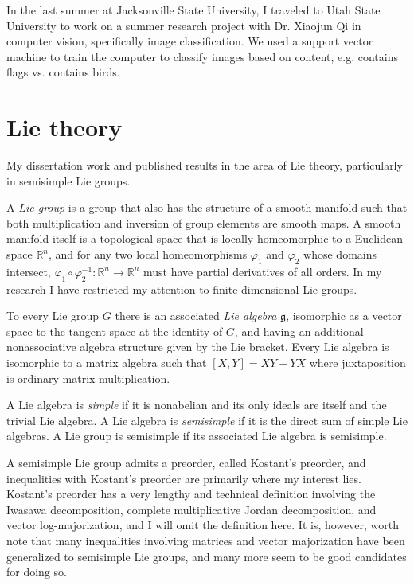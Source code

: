 \documentclass[11pt]{article}
\begin{document}
In the last summer at Jacksonville State University, I traveled to Utah State
University to work on a summer research project with Dr. Xiaojun Qi in computer
vision, specifically image classification. We used a support vector machine to
train the computer to classify images based on content, e.g. contains flags
vs. contains birds.

\section{Lie theory}

My dissertation work and published results in the area of
Lie theory, particularly in semisimple Lie groups.

A \emph{Lie group} is a group that also has the structure of a smooth manifold
such that both multiplication and inversion of group elements are smooth maps. A
smooth manifold itself is a topological space that is locally homeomorphic to a
Euclidean space \( \mathbb{R}^n \),
and for any two local homeomorphisms \( \varphi_1 \)
and \( \varphi_2 \)
whose domains intersect,
\( \varphi_1 \circ \varphi_2^{-1}: \mathbb{R}^n \to \mathbb{R}^n \)
must have partial derivatives of all orders. In my research I have restricted my
attention to finite-dimensional Lie groups.

To every Lie group $G$ there is an associated \emph{Lie algebra} \(
\mathfrak{g} \), isomorphic as a vector space to the tangent space at the identity
of $G$, and having an additional nonassociative algebra structure given by the
Lie bracket. Every Lie algebra is isomorphic to a matrix algebra such that \(
[X,Y] = XY - YX \) where juxtaposition is ordinary matrix multiplication. 

A Lie algebra is \emph{simple} if it is nonabelian and its only ideals are
itself and the trivial Lie algebra. A Lie algebra is \emph{semisimple} if it is
the direct sum of simple Lie algebras. A Lie group is semisimple if its
associated Lie algebra is semisimple.

A semisimple Lie group admits a preorder, called Kostant's preorder, and
inequalities with Kostant's preorder are primarily where my interest
lies. Kostant's preorder has a very lengthy and technical definition involving
the Iwasawa decomposition, complete multiplicative Jordan decomposition, and
vector log-majorization, and I will omit the definition here. It is, however,
worth note that many inequalities involving matrices and vector majorization
have been generalized to semisimple Lie groups, and many more seem to be good
candidates for doing so.
\end{document}
